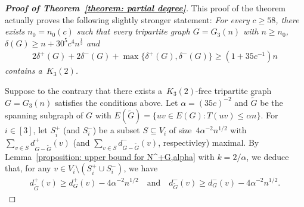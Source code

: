 \documentclass[11pt]{article}
\newcommand{\tG}{\widetilde{G}}
\numberwithin{equation}{section}
\begin{document}
	\begin{proof}[\textbf{Proof of Theorem~\ref{theorem: partial degree}}]
		This proof of the theorem actually proves the following slightly stronger statement: \emph{For every $c \ge 58$, there exists $n_0 = n_0(c)$ such that every tripartite graph $G=G_3(n)$ with $n \ge n_0$, $\delta(G)\geq n+ 30^5 c^4 n^{\frac{1}{2}}$ and 
		\begin{align}\label{eq:32m}
	2\delta^+(G) + 2\delta^-(G) + \max\{\delta^+(G), \delta^-(G)\}\ge \left(1+35c^{-1}\right)n
		\end{align}
contains a~$K_3(2)$.} 

    Suppose to the contrary that there exists a~$K_3(2)$-free tripartite graph $G=G_3(n)$ satisfies the conditions above. Let $\alpha = (35c)^{-2}$ and $\tG$ be the spanning subgraph of $G$ with $E(\tG) = \{uv\in E(G): T(uv)\le \alpha n\}$. 
		For $i \in [3]$, let $S_i^+$ (and $S_i^-$) be a subset $S \subseteq V_i$ of size~$4 \alpha^{-2} n^{1/2}$ with $\sum_{v \in S} d^+_{G - \tG}(v)$ (and $\sum_{v \in S} d^-_{G - \tG}(v)$, respectivley) maximal. 
By Lemma~\ref{proposition: upper bound for N^+G,alpha} with $k=2/\alpha$, we deduce that, for any $v\in V_i\setminus (S_i^+\cup S_i^-)$, we have 
        \begin{align}\label{eq:d+-}
        d^+_{\tG}(v)\ge d^+_G(v) - 4 \alpha^{-2} n^{1/2} \quad \text{and} \quad d^-_{\tG}(v)\ge d^-_G(v) - 4 \alpha^{-2} n^{1/2}.
        \end{align}
		

\end{proof}
\end{document}
